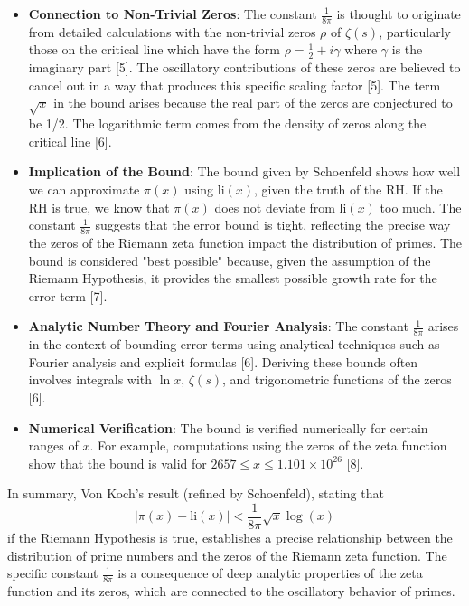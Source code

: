 \documentclass{article}
\begin{document}
\begin{itemize}
     \item \textbf{Connection to Non-Trivial Zeros}: The constant $\frac{1}{8\pi}$ is thought to originate from detailed calculations with the non-trivial zeros $\rho$ of $\zeta(s)$, particularly those on the critical line which have the form $\rho = \frac{1}{2} + i\gamma$ where $\gamma$ is the imaginary part [5]. The oscillatory contributions of these zeros are believed to cancel out in a way that produces this specific scaling factor [5]. The term $\sqrt{x}$ in the bound arises because the real part of the zeros are conjectured to be 1/2. The logarithmic term comes from the density of zeros along the critical line [6].
     \item \textbf{Implication of the Bound}: The bound given by Schoenfeld shows how well we can approximate $\pi(x)$ using $\text{li}(x)$, given the truth of the RH. If the RH is true, we know that $\pi(x)$ does not deviate from $\text{li}(x)$ too much. The constant $\frac{1}{8\pi}$ suggests that the error bound is tight, reflecting the precise way the zeros of the Riemann zeta function impact the distribution of primes. The bound is considered "best possible" because, given the assumption of the Riemann Hypothesis, it provides the smallest possible growth rate for the error term [7].
     \item \textbf{Analytic Number Theory and Fourier Analysis}: The constant $\frac{1}{8\pi}$ arises in the context of bounding error terms using analytical techniques such as Fourier analysis and explicit formulas [6]. Deriving these bounds often involves integrals with $\ln x$, $\zeta(s)$, and trigonometric functions of the zeros [6].
     \item \textbf{Numerical Verification}: The bound is verified numerically for certain ranges of $x$. For example, computations using the zeros of the zeta function show that the bound is valid for $2657 \leq x \leq 1.101 \times 10^{26}$ [8].
\end{itemize}

In summary, Von Koch's result (refined by Schoenfeld), stating that 
$$|\pi(x) - \text{li}(x)| < \frac{1}{8\pi} \sqrt{x} \log(x)$$ 
if the Riemann Hypothesis is true, establishes a precise relationship between the distribution of prime numbers and the zeros of the Riemann zeta function. The specific constant $\frac{1}{8\pi}$ is a consequence of deep analytic properties of the zeta function and its zeros, which are connected to the oscillatory behavior of primes.
\end{document}
